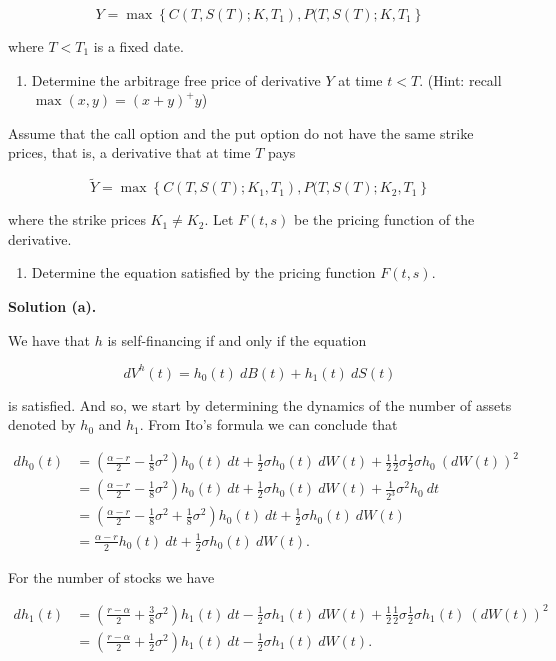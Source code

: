 \documentclass[
]{article}
\providecommand{\tightlist}{%
  \setlength{\itemsep}{0pt}\setlength{\parskip}{0pt}}
\begin{document}
\[
Y=\max\left\{C(T,S(T);K,T_1),P(T,S(T);K,T_1\right\}
\]

where \(T<T_1\) is a fixed date.

\begin{enumerate}
\def\labelenumi{\alph{enumi}.}
\setcounter{enumi}{2}
\tightlist
\item
  Determine the arbitrage free price of derivative \(Y\) at time
  \(t<T\). (Hint: recall \(\max(x,y)=(x+y)^+y\))
\end{enumerate}

Assume that the call option and the put option do not have the same
strike prices, that is, a derivative that at time \(T\) pays

\[
\widetilde{Y}=\max\left\{C(T,S(T);K_1,T_1),P(T,S(T);K_2,T_1\right\}
\]

where the strike prices \(K_1\ne K_2\). Let \(F(t,s)\) be the pricing
function of the derivative.

\begin{enumerate}
\def\labelenumi{\alph{enumi}.}
\setcounter{enumi}{3}
\tightlist
\item
  Determine the equation satisfied by the pricing function \(F(t,s)\).
\end{enumerate}

\textbf{Solution (a).}

We have that \(h\) is self-financing if and only if the equation

\[
dV^h(t)=h_0(t)\ dB(t)+h_1(t)\ dS(t)
\]

is satisfied. And so, we start by determining the dynamics of the number
of assets denoted by \(h_0\) and \(h_1\). From Ito's formula we can
conclude that

\begin{align*}
dh_0(t)&=\left(\frac{\alpha - r}{2}-\frac{1}{8}\sigma^2\right)h_0(t)\ dt+\frac{1}{2}\sigma h_0(t)\ dW(t)+\frac{1}{2} \frac{1}{2}\sigma \frac{1}{2}\sigma h_0 \ (d W(t))^2\\
&=\left(\frac{\alpha - r}{2}-\frac{1}{8}\sigma^2\right)h_0(t)\ dt+\frac{1}{2}\sigma h_0(t)\ dW(t)+ \frac{1}{2^3}\sigma^2 h_0 \ dt\\
&=\left(\frac{\alpha - r}{2}-\frac{1}{8}\sigma^2+ \frac{1}{8}\sigma^2 \right)h_0(t)\ dt+\frac{1}{2}\sigma h_0(t)\ dW(t)\\
&=\frac{\alpha - r}{2}h_0(t)\ dt+\frac{1}{2}\sigma h_0(t)\ dW(t).
\end{align*}

For the number of stocks we have

\begin{align*}
dh_1(t)&=\left(\frac{r-\alpha}{2}+\frac{3}{8}\sigma^2\right)h_1(t)\ dt-\frac{1}{2}\sigma h_1(t)\ dW(t)+ \frac{1}{2}\frac{1}{2}\sigma\frac{1}{2}\sigma h_1(t)\ (dW(t))^2\\
&=\left(\frac{r-\alpha}{2}+\frac{1}{2}\sigma^2\right)h_1(t)\ dt-\frac{1}{2}\sigma h_1(t)\ dW(t).
\end{align*}
\end{document}
